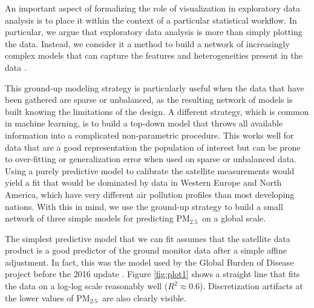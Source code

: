 \documentclass{statsoc}
\newcommand{\PM}{PM$_{2.5}$}
\begin{document}
An important aspect of formalizing the role of visualization in exploratory data
analysis is to place it within the context of a particular statistical workflow.
In particular, we argue that exploratory data analysis is more than simply
plotting the data. Instead, we consider it a method to build a network of
increasingly complex models that can capture the features and heterogeneities
present in the data   \citep{gelman2004exploratory}.

This ground-up modeling strategy is particularly useful when the data that have
been gathered are sparse or unbalanced, as the resulting network of models is
built knowing the limitations of the design. A different strategy, which is
common in machine learning, is to build a top-down model that throws all
available information into a complicated non-parametric procedure.  This works
well for data that are a good representation the population of interest but can
be prone to over-fitting or generalization error when used on sparse or
unbalanced data.  Using a purely predictive model to calibrate the satellite
measurements would yield a fit that would be dominated by data in Western Europe
and North America, which have very different air pollution profiles than most
developing nations. With this in mind, we use the ground-up strategy to build a
small network of three simple models for predicting \PM\ on a global scale.

The simplest predictive model that we can fit assumes that the satellite data
product is a good predictor of the ground monitor data after a simple affine
adjustment. In fact, this was the model used by the Global Burden of Disease
project before the 2016 update \citep{forouzanfar2015global}. Figure
\ref{fig:plot1} shows a straight line that fits the data on a log-log scale
reasonably well ($R^2 \approx 0.6$). Discretization artifacts at the lower
values of \PM\ are also clearly visible.
\end{document}
